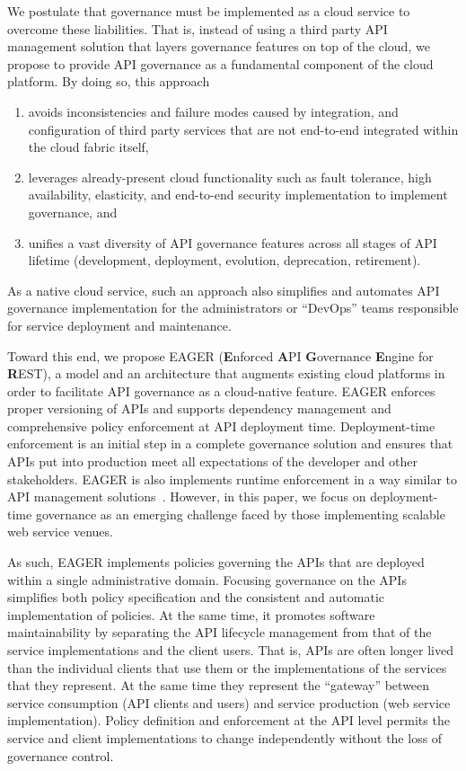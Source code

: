 We postulate that governance must be implemented as a cloud service to
overcome these liabilities.
That is, instead of using a third party API management
solution that layers governance features on top of the cloud, 
we propose to provide API governance as a fundamental component of the cloud
platform.  By doing so, this approach
\begin{enumerate}
\item avoids inconsistencies and failure modes caused  
by integration, and configuration of third party services that are not
end-to-end integrated within the cloud fabric itself, 
\item leverages already-present cloud functionality such as fault tolerance,
high availability, elasticity, and end-to-end security implementation to
implement governance, and
\item unifies a vast diversity of API
governance features across all stages of API lifetime
(development, deployment, evolution, deprecation, retirement). 
\end{enumerate}
As a native cloud service, such an
approach also simplifies and automates API governance implementation for
the administrators or ``DevOps'' teams responsible for service deployment and
maintenance.

Toward this end, we propose EAGER ({\bf E}nforced {\bf A}PI {\bf G}overnance
{\bf E}ngine for {\bf R}EST), 
a model and an architecture that augments existing
cloud platforms in order to facilitate API governance as a 
cloud-native feature. EAGER enforces proper versioning of APIs and supports dependency 
management and comprehensive policy enforcement at API deployment time. 
Deployment-time enforcement is an initial step in a complete governance
solution and ensures that APIs put into production meet all expectations of
the developer and other stakeholders.  EAGER is also implements runtime
enforcement in a way similar to API management
solutions~\cite{XXXWS02APImanager,XXX,XXX}.  However, in this paper, we focus
on deployment-time governance as an emerging challenge faced by those
implementing scalable web service venues. 

As such, EAGER implements policies governing the APIs that are 
deployed within a single administrative domain.  Focusing governance on
the APIs simplifies both policy specification and the consistent
and automatic implementation of policies.  At the same time, it promotes
software maintainability by separating the API lifecycle management from that
of the service implementations and the client users.  That is, APIs are often
longer lived than the individual clients that use them or the implementations
of the services that they represent.  At the same time they represent the
``gateway'' between service consumption (API clients and users) and service
production (web service implementation).  Policy definition and enforcement at
the API level permits the service and client implementations to change
independently without the loss of governance control.

